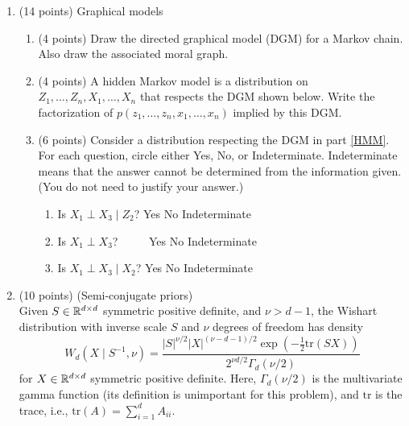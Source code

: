 \documentclass[12pt]{article}
\begin{document}
\normalsize

\newpage
\begin{enumerate}
\item (14 points) Graphical models
    \begin{enumerate}
        \setlength\itemsep{16em}
        \item (4 points) Draw the directed graphical model (DGM) for a Markov chain. Also draw the associated moral graph.
        \item\label{HMM} (4 points)
            A hidden Markov model is a distribution on $Z_1,\ldots,Z_n,X_1,\ldots,X_n$ that respects the DGM shown below.
            Write the factorization of $p(z_1,\ldots,z_n,x_1,\ldots,x_n)$ implied by this DGM.
        \item (6 points) Consider a distribution respecting the DGM in part \ref{HMM}.
            For each question, circle either Yes, No, or Indeterminate. Indeterminate means that the answer cannot be determined 
            from the information given.  (You do not need to justify your answer.)
            \vspace{1em}
            \begin{enumerate}
                \setlength\itemsep{1em}
                \item Is $X_1 \perp X_3 \mid Z_2$? \hspace{1cm}  Yes \hspace{1cm} No \hspace{1cm} Indeterminate
                \item Is $X_1 \perp X_3$? $\phantom{\,\mid Z_2}$ \hspace{1cm}  Yes \hspace{1cm} No \hspace{1cm} Indeterminate
                \item Is $X_1 \perp X_3 \mid X_2$? \hspace{1cm}  Yes \hspace{1cm} No \hspace{1cm} Indeterminate
            \end{enumerate}
    \end{enumerate}




\newpage
\item\label{semi-conjugate} (10 points) (Semi-conjugate priors)\\
    Given  $S\in\mathbb{R}^{d\times d}$ symmetric positive definite, and $\nu > d-1$,
    the Wishart distribution with inverse scale $S$ and $\nu$ degrees of freedom has density
    $$W_d(X\mid S^{-1},\nu) 
    = \frac{|S|^{\nu/2} |X|^{(\nu-d-1)/2} \exp(-\tfrac{1}{2}\mathrm{tr}(S X))}{2^{\nu d/2}\Gamma_d(\nu/2)}$$
    for $X\in\mathbb{R}^{d\times d}$ symmetric positive definite. 
    Here, $\Gamma_d(\nu/2)$ is the multivariate gamma function (its definition is unimportant for this problem), and $\mathrm{tr}$ is the trace,
    i.e., $\mathrm{tr}(A) = \sum_{i = 1}^d A_{i i}$.
    

\end{enumerate}
\end{document}
